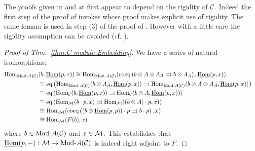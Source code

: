 \documentclass{amsart}
\begin{document}
\noindent The proofs given in \cite{EGNO} and \cite{MR1976459} at first appear to depend on  the rigidity of $\mathcal C$. Indeed the first step of the proof of \cite[Thm 2.11.2]{EGNO} invokes \cite[lemma 2.10.4.(4)]{EGNO} whose proof makes explicit use of rigidity. The same lemma is used in step (3) of the proof of \cite[Thm 1]{MR1976459}. However with a little care the rigidity assumption can be avoided (cf. \cite[Rmk. 2.11.3]{EGNO}).  

\begin{proof}[Proof of Thm.~\ref{thm:C-module-Embedding}]
	We have a series of natural isomorphisms:
	\begin{align*}
		\Hom_{\Mod{}{A}(\cC)}&(b, \IHom(p,x))  \cong \Hom_{\Mod{}{A}(\cC)}( \coeq \left( b \otimes A \otimes A_A \rightrightarrows b \otimes A_A  \right), \IHom(p,x)) \\
		& \cong \eq \left( \Hom_{\Mod{}{A}(\cC)}(b \otimes A_A, \IHom(p,x) )  \rightrightarrows \Hom_{\Mod{}{A}(\cC)}(  b \otimes A \otimes A_A, \IHom(p,x))  \right) \\
		& \cong \eq \left( \Hom_{\cC}(b, \IHom(p,x) )  \rightrightarrows \Hom_{\cC}(  b \otimes A, \IHom(p,x))  \right) \\
		& \cong \eq \left( \Hom_{\cM}(b \cdot p, x )  \rightrightarrows \Hom_{\cM}(  (b \otimes A) \cdot p, x)  \right) \\
		& \cong  \Hom_{\cM}( \coeq \left( (b \otimes \IHom(p,p)) \cdot p \rightrightarrows b \cdot p \right), x) \\
		& \cong \Hom_{\cM}( F(b), x)
	\end{align*}   
	where $b \in \Mod{}{A}(\cC)$ and $x \in \mathcal M$. This establishes that $\IHom(p,-): \cM \to \Mod{}{A}(\cC)$ is indeed right adjoint to $F$.


\end{proof}
\end{document}
